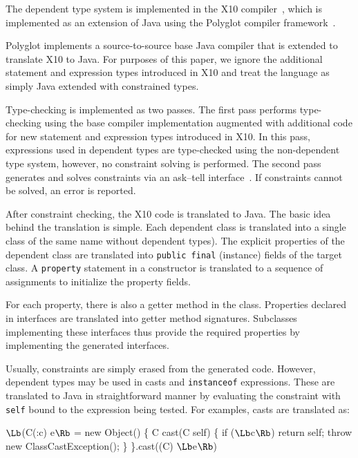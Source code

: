 %

The dependent type system is implemented in the X10
compiler~\cite{X10}, which is implemented as an extension of
Java using the Polyglot compiler framework~\cite{ncm03}.

Polyglot implements a source-to-source base Java compiler 
that is extended to translate X10 to Java.  For purposes of this
paper, we ignore the additional statement and expression types
introduced in X10 and treat the language as simply Java
extended with constrained types.

Type-checking is implemented as two passes.  The first pass
performs type-checking using the base compiler implementation
augmented with additional code for new statement and expression
types introduced in X10. In this pass, expressions used in
dependent types are type-checked using the non-dependent type
system, however, no constraint solving is performed.
The second pass generates and solves constraints via an
ask--tell interface~\cite{my-thesis-book}.
If constraints cannot be solved, an error is reported.

After constraint checking, the X10 code is translated to Java.
The basic idea behind the translation is simple. Each dependent class
is translated into a single class of the same name without dependent
types). The explicit properties of the dependent class are translated
into {\tt public final} (instance) fields of the target class.
A {\tt property} statement in a constructor is translated to a
sequence of assignments to initialize the property fields.

For each property, there is also a getter method in the class.
Properties declared in interfaces are translated into getter
method signatures.  Subclasses implementing these interfaces
thus provide the required properties by implementing the
generated interfaces.

Usually, constraints are simply erased from the generated code.
However, dependent types may be used in casts
and {\tt instanceof} expressions.  These are translated to Java
in straightforward manner by evaluating the constraint with
{\tt self} bound to the expression being tested.
For examples, casts are translated as:
\begin{code}
  $\Lb$(C(:c) e$\Rb$ = 
    new Object() \{
      C cast(C self) \{
        if ($\Lb$c$\Rb$)
          return self;
        throw new ClassCastException();
      \}
    \}.cast((C) $\Lb$e$\Rb$)
\end{code}



